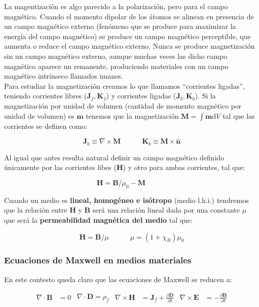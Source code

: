 \documentclass[12pt]{article}
\newcommand{\parciales}[2]{\frac{\partial #1}{\partial #2}}
\newcommand{\D}{\mathrm{d}}
\newcommand{\tquad}{\quad \quad \quad}
\newcommand{\rota}{\nabla \times}
\newcommand{\dive}{\nabla \cdot}
\newcommand{\Bn}{\mathbf{B}}
\newcommand{\En}{\mathbf{E}}
\newcommand{\Dn}{\mathbf{D}}
\newcommand{\Hn}{\mathbf{H}}
\newcommand{\Jn}{\mathbf{J}}
\newcommand{\Kn}{\mathbf{K}}
\newcommand{\mn}{\mathbf{m}}
\newcommand{\Mn}{\mathbf{M}}
\newcommand{\hnn}{\hat{\mathbf{n}}}
\numberwithin{equation}{section}
\numberwithin{figure}{section}
\begin{document}
La magentización es algo parecido a la polarización, pero para el campo magnético. Cuando el momento dipolar de los átomos se alinean en presencia de un campo magnético externo (fenómeno que se produce para maximizar la energía del campo magnético) se produce un campo magnético perceptible, que aumenta o reduce el campo magnético externo. Nunca se produce magnetización sin un campo magnético externo, aunque muchas veces las dicho campo magnético aparece un remanente, produciendo materiales con un campo magnético intrínseco llamados imanes. \\

Para estudiar la magnetización creamos lo que llamamos ``corrientes ligadas'', teniendo corrientes libres ($\Jn_f, \Kn_f$) y corrientes ligadas ($\Jn_b,\Kn_b$). Si la magnetización por unidad de volumen  (cantidad de momento magnético por unidad de volumen) es $\mn$ tenemos que la magnetización $\Mn = \int \mn \D V$ tal que las corrientes se definen como:

\begin{equation}
\Jn_b \equiv \rota \Mn \tquad \Kn_b \equiv \Mn \times \hnn
\end{equation}

Al igual que antes resulta natural definir un campo magnético definido únicamente por las corrientes libes ($\Hn$) y otro para ambas corrientes, tal que:

\begin{equation}
\Hn = \Bn/\mu_0 - \Mn \tquad
\end{equation}

Cuando un medio es \textbf{lineal, homogéneo e isótropo} (medio l.h.i.) tendremos que la relación entre $\Hn$ y $\Bn$ será una relación lineal dada por una constante $\mu$ que será la \textbf{permeabilidad magnética del medio} tal que:

\begin{equation}
\Hn = \Bn / \mu \tquad \mu = (1+\chi_B) \mu_0
\end{equation}


\subsubsection{Ecuaciones de Maxwell en medios materiales}

En este contesto queda claro que las ecuaciones de Maxwell se reducen a:



\begin{subequations}\label{Ec:5.1.Maxwell}
\begin{align}
\dive \Bn & = 0 \label{Ec:5.1.a.DivB}
\end{align}
\begin{align}
\dive \Dn = \rho_f \label{Ec:5.1.b.DivD}
\end{align}
\begin{align}
\rota \Hn  & =  \Jn_f + \parciales{\Dn}{t} \label{Ec:5.1.c.RotH}
\end{align}
\begin{align}
\rota \En  & = -  \parciales{\Bn}{t} \label{Ec:5.1.d.RotE}
\end{align}
\end{subequations}
\end{document}
